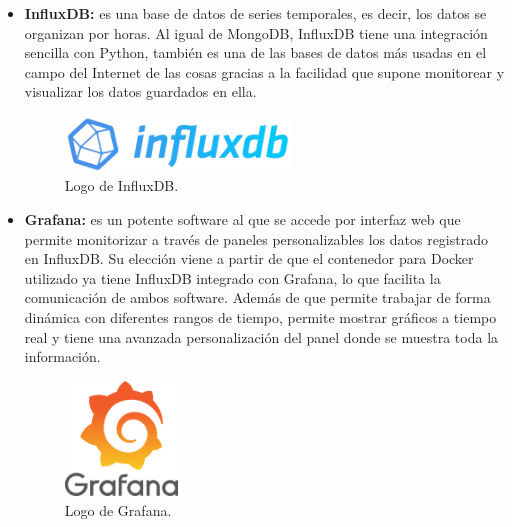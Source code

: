 \begin{itemize}
    \item \textbf{InfluxDB: }es una base de datos de series temporales, es decir, los datos se organizan por horas. Al igual de MongoDB, InfluxDB tiene una integración sencilla con Python, también es una de las bases de datos más usadas en el campo del Internet de las cosas gracias a la facilidad que supone monitorear y visualizar los datos guardados en ella.
    \begin{figure}[h]
        \centering
        \includegraphics[width=6cm]{imagenes/capitulo3/influxDBLogo.png}
        \caption{Logo de InfluxDB.}
        \label{fig:influxdb_logo}
    \end{figure}

    \item \textbf{Grafana: }es un potente software al que se accede por interfaz web que permite monitorizar a través de paneles personalizables los datos registrado en InfluxDB. Su elección viene a partir de que el contenedor para Docker utilizado ya tiene InfluxDB integrado con Grafana, lo que facilita la comunicación de ambos software. Además de que permite trabajar de forma dinámica con diferentes rangos de tiempo, permite mostrar gráficos a tiempo real y tiene una avanzada personalización del panel donde se muestra toda la información.
    \begin{figure}[h]
        \centering
        \includegraphics[width=3cm]{imagenes/capitulo3/GrafanaLogo.png}
        \caption{Logo de Grafana.}
        \label{fig:grafana_logo}
    \end{figure}
    
\end{itemize}

